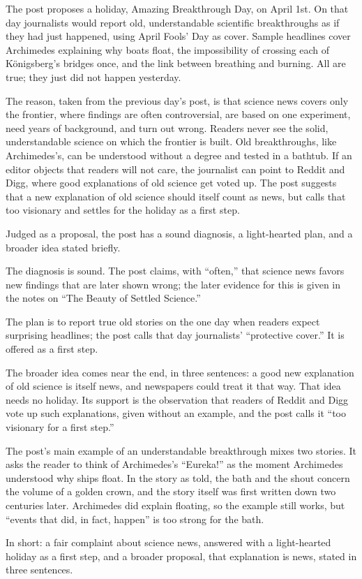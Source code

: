 \begin{afterword}
\summaryhead

The post proposes a holiday, Amazing Breakthrough Day, on April 1st. On that day journalists would report old, understandable scientific breakthroughs as if they had just happened, using April Fools' Day as cover. Sample headlines cover Archimedes explaining why boats float, the impossibility of crossing each of Königsberg's bridges once, and the link between breathing and burning. All are true; they just did not happen yesterday.

The reason, taken from the previous day's post, is that science news covers only the frontier, where findings are often controversial, are based on one experiment, need years of background, and turn out wrong. Readers never see the solid, understandable science on which the frontier is built. Old breakthroughs, like Archimedes's, can be understood without a degree and tested in a bathtub. If an editor objects that readers will not care, the journalist can point to Reddit and Digg, where good explanations of old science get voted up. The post suggests that a new explanation of old science should itself count as news, but calls that too visionary and settles for the holiday as a first step.

\responsehead

Judged as a proposal, the post has a sound diagnosis, a light-hearted plan, and a broader idea stated briefly.

The diagnosis is sound. The post claims, with ``often,'' that science news favors new findings that are later shown wrong; the later evidence for this is given in the notes on ``The Beauty of Settled Science.''

The plan is to report true old stories on the one day when readers expect surprising headlines; the post calls that day journalists' ``protective cover.'' It is offered as a first step.

The broader idea comes near the end, in three sentences: a good new explanation of old science is itself news, and newspapers could treat it that way. That idea needs no holiday. Its support is the observation that readers of Reddit and Digg vote up such explanations, given without an example, and the post calls it ``too visionary for a first step.''

The post's main example of an understandable breakthrough mixes two stories. It asks the reader to think of Archimedes's ``Eureka!'' as the moment Archimedes understood why ships float. In the story as told, the bath and the shout concern the volume of a golden crown, and the story itself was first written down two centuries later. Archimedes did explain floating, so the example still works, but ``events that did, in fact, happen'' is too strong for the bath.

In short: a fair complaint about science news, answered with a light-hearted holiday as a first step, and a broader proposal, that explanation is news, stated in three sentences.
\end{afterword}
